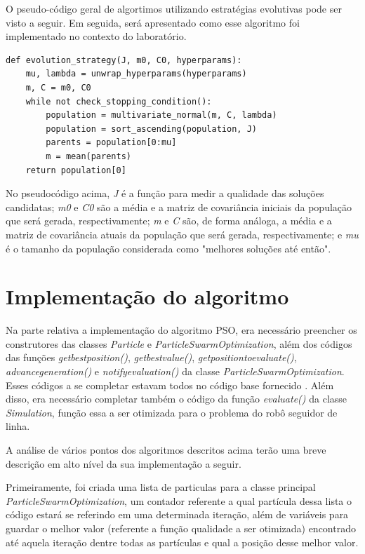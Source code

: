 \documentclass[conference]{IEEEtran}
\begin{document}
O pseudo-código geral de algortimos utilizando estratégias evolutivas pode ser visto a seguir. Em seguida, será apresentado como esse algoritmo foi implementado no contexto do laboratório.

\begin{lstlisting}
def evolution_strategy(J, m0, C0, hyperparams):
	mu, lambda = unwrap_hyperparams(hyperparams)
	m, C = m0, C0
	while not check_stopping_condition():
		population = multivariate_normal(m, C, lambda)
		population = sort_ascending(population, J)
		parents = population[0:mu]
		m = mean(parents)
	return population[0]
\end{lstlisting}

No pseudocódigo acima, \textit{J} é a função para medir a qualidade das soluções candidatas; \textit{m0} e \textit{C0} são a média e a matriz de covariância iniciais da população que será gerada, respectivamente; \textit{m} e \textit{C} são, de forma análoga, a média e a matriz de covariância atuais da população que será gerada, respectivamente; e \textit{mu} é o tamanho da população considerada como "melhores soluções até então".


\section{Implementação do algoritmo}
Na parte relativa a implementação do algoritmo PSO, era necessário preencher os construtores das classes \textit{Particle} e \textit{ParticleSwarmOptimization}, além dos códigos das funções \textit{get\underline{\space}best\underline{\space}position()}, \textit{get\underline{\space}best\underline{\space}value()}, \textit{get\underline{\space}position\underline{\space}to\underline{\space}evaluate()}, \textit{advance\underline{\space}generation()} e \textit{notify\underline{\space}evaluation()} da classe \textit{ParticleSwarmOptimization}. Esses códigos a se completar estavam todos no código base fornecido \cite{b1}.  Além disso, era necessário completar também o código da função \textit{evaluate()} da classe \textit{Simulation}, função essa a ser otimizada para o problema do robô seguidor de linha. 

A análise de vários pontos dos algoritmos descritos acima terão uma breve descrição em alto nível da sua implementação a seguir. 

Primeiramente, foi criada uma lista de particulas para a classe principal \textit{ParticleSwarmOptimization}, um contador referente a qual partícula dessa lista o código estará se referindo em uma determinada iteração, além de variáveis para guardar o melhor valor (referente a função qualidade a ser otimizada) encontrado até aquela iteração dentre todas as partículas e qual a posição desse melhor valor.
\end{document}
